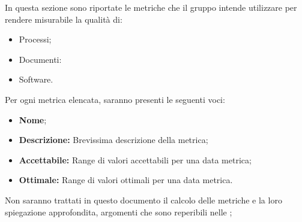 In questa sezione sono riportate le metriche che il gruppo \gruppo \space intende utilizzare per rendere misurabile la qualità di:
\begin{itemize}
	\item Processi;
	\item Documenti:
	\item Software.
\end{itemize}

Per ogni metrica elencata, saranno presenti le seguenti voci:
\begin{itemize}
	\item \textbf{Nome};
	\item \textbf{Descrizione: }Brevissima descrizione della metrica;
	\item \textbf{Accettabile: }Range di valori accettabili per una data metrica;
	\item \textbf{Ottimale: }Range di valori ottimali per una data metrica.
\end{itemize}

Non saranno trattati in questo documento il calcolo delle metriche e la loro spiegazione approfondita, argomenti che sono reperibili nelle \NdP ;